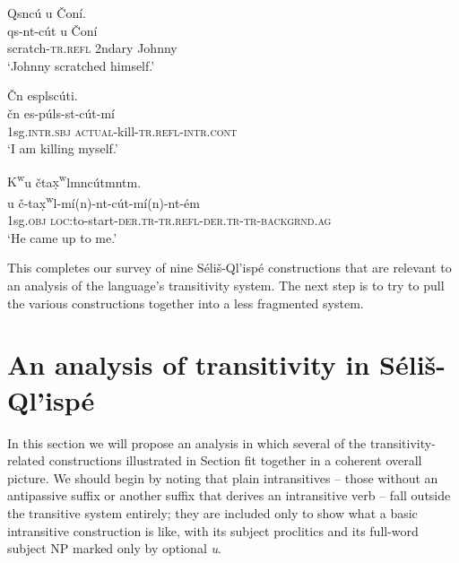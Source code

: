 \documentclass[output=paper,colorlinks,citecolor=brown]{langscibook}
\begin{document}
\ea 
\label{ex-thomason-42}
Qsnc\'u {\textltilde}u \v{C}on\'i. \\
\gll qs-nt-c\'ut {\textltilde}u \v{C}on\'i \\ 
scratch-\textsc{tr.refl} 2ndary Johnny \\
\glt `Johnny scratched himself.'
\z

\ea 
\label{ex-thomason-43}
\v{C}n esplsc\'uti. \\
\gll \v{c}n es-p\'uls-st-c\'ut-m\'i \\
1sg.\textsc{intr.sbj} \textsc{actual}-kill-\textsc{tr.refl-intr.cont} \\
\glt  `I am killing myself.'
\z

\ea 
\label{ex-thomason-44}
{K\textsuperscript w}u \v{c}ta{\d{x}\textsuperscript w}lmnc\'utmntm. \\
u \v{c}-ta{\d{x}\textsuperscript
 w}l-m\'i(n)-nt-c\'ut-m\'i(n)-nt-\'em \\ 
1sg.\textsc{obj} \textsc{loc}:to-start-\textsc{der.tr-tr.refl-der.tr-tr-backgrnd.ag} \\
\glt `He came up to me.'
\z


This completes our survey of nine S\'eli\v{s}-Ql'isp\'e constructions
that are relevant to an analysis of the language's transitivity
system.  The next step is to try to pull the various constructions
together into a less fragmented system.

\section{An analysis of transitivity in S\'eli\v{s}-Ql'isp\'e}  %
\label{thomason_section_3}

In this section we will propose an analysis in which several of the
transitivity-related constructions illustrated in
Section  fit
together in a coherent overall picture.  We should begin by noting
that plain intransitives -- those without an antipassive suffix or
another suffix that derives an intransitive verb -- fall outside the
transitive system entirely; they are included only to show what a
basic intransitive construction is like, with its subject proclitics
and its full-word subject NP marked only by optional \emph{{\textltilde}u}.
\end{document}
